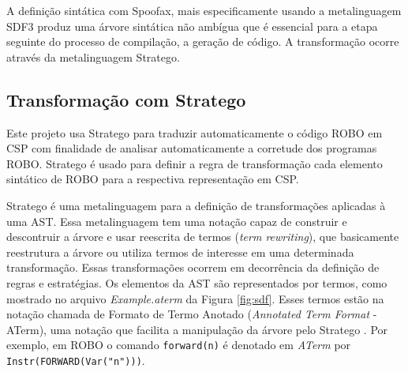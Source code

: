 A definição sintática com Spoofax, mais especificamente usando a metalinguagem SDF3
produz uma árvore sintática não ambígua que é essencial para a etapa seguinte do processo de compilação, a geração de código. A transformação ocorre através da metalinguagem Stratego.

\subsection{Transformação com Stratego}


Este projeto usa Stratego para traduzir automaticamente o código ROBO em CSP com finalidade de analisar automaticamente a corretude dos programas ROBO. Stratego é usado para definir a regra de transformação cada elemento sintático de ROBO para a respectiva representação em CSP.

Stratego é uma metalinguagem para a definição de transformações aplicadas à uma AST. Essa metalinguagem tem uma notação capaz de construir e descontruir a árvore e usar reescrita de termos (\textit{term rewriting}), que basicamente reestrutura a árvore ou utiliza termos de interesse em uma determinada transformação. Essas transformações ocorrem em decorrência da definição de regras e estratégias. Os elementos da AST são representados por termos, como mostrado no arquivo \textit{Example.aterm} da Figura \ref{fig:sdf}. Esses termos estão na notação chamada de Formato de Termo Anotado (\textit{Annotated Term Format} - ATerm), uma notação que facilita a manipulação da árvore pelo Stratego  \cite{metaborg}. Por exemplo, em ROBO o comando \texttt{forward(n)} é denotado em \textit{ATerm} por \texttt{Instr(FORWARD(Var("n")))}.


